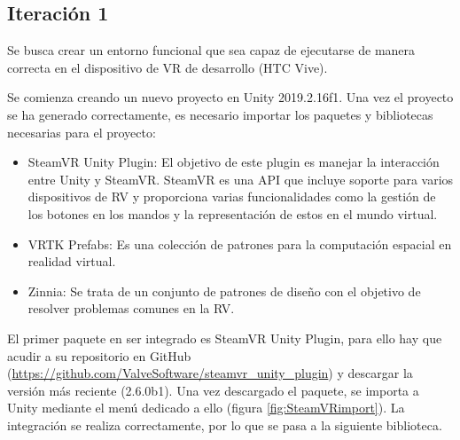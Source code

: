 
\subsection{Iteración 1}

\label{sec:Entrega1Iteracion1}

Se busca crear un entorno funcional que sea capaz de ejecutarse de manera correcta en el dispositivo de VR de desarrollo (HTC Vive).

Se comienza creando un nuevo proyecto en Unity 2019.2.16f1. Una vez el proyecto se ha generado correctamente, es necesario importar los paquetes y bibliotecas necesarias para el proyecto:


\begin{itemize}
	\item{SteamVR Unity Plugin: El objetivo de este plugin es manejar la interacción entre Unity y SteamVR. SteamVR es una API que incluye soporte para varios dispositivos de RV y proporciona varias funcionalidades como la gestión de los botones en los mandos y la representación de estos en el mundo virtual.}

	\item{VRTK Prefabs: Es una colección de patrones para la computación espacial en realidad virtual.}
	
	\item{Zinnia: Se trata de un conjunto de patrones de diseño con el objetivo de resolver problemas comunes en la RV.}

\end{itemize}

El primer paquete en ser integrado es SteamVR Unity Plugin, para ello hay que acudir a su repositorio en GitHub (\url{https://github.com/ValveSoftware/steamvr\_unity\_plugin}) y descargar la versión más reciente (2.6.0b1). Una vez descargado el paquete, se importa a Unity mediante el menú dedicado a ello (figura \ref{fig:SteamVRimport}). La integración se realiza correctamente, por lo que se pasa a la siguiente biblioteca.

